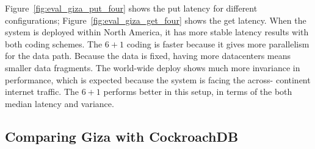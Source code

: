 Figure~\ref{fig:eval_giza_put_four} shows the put latency for different configurations; 
Figure~\ref{fig:eval_giza_get_four} shows the get latency. When the system is deployed within 
North America, it has more stable latency results with both coding schemes. The $6+1$ coding
is faster because it gives more parallelism for the data path. Because the data is fixed, 
having more datacenters means smaller data fragments. The world-wide deploy shows much 
more invariance in performance, which is expected because the system is facing the across-
continent internet traffic. The $6+1$ performs better in this setup, in terms of the 
both median latency and variance. 


\subsection{Comparing Giza with CockroachDB}



